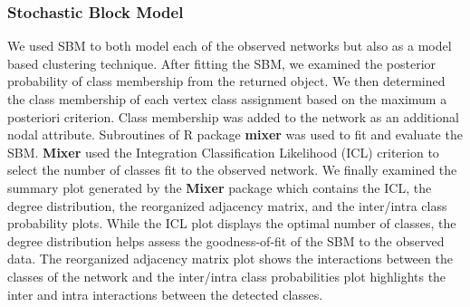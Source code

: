 \subsubsection{Stochastic Block Model}
\label{sec:methods_sbm}
We used SBM to both model each of the observed networks but also as a model based clustering technique. After fitting the SBM, we examined the posterior probability of class membership from the returned object. We then determined the class membership of each vertex class assignment based on the maximum a posteriori criterion. Class membership was added to the network as an additional nodal attribute. Subroutines of R package \textbf{mixer} \citep{Daudinmixturemodelrandom2008,ZanghiFastonlinegraph2008,ZanghiStrategiesonlineinference2010,LatoucheVariationalBayesianinference2012} was used to fit and evaluate the SBM. \textbf{Mixer} used the Integration Classification Likelihood (ICL) criterion to select the number of classes fit to the observed network. We finally examined the summary plot generated by the \textbf{Mixer} package which contains the ICL, the degree distribution, the reorganized adjacency matrix, and the inter/intra class probability plots. While the ICL plot displays the optimal number of classes, the degree distribution helps assess the goodness-of-fit of the SBM to the observed data. The reorganized adjacency matrix plot shows the interactions between the classes of the network and the inter/intra class probabilities plot highlights the inter and intra interactions between the detected classes.

